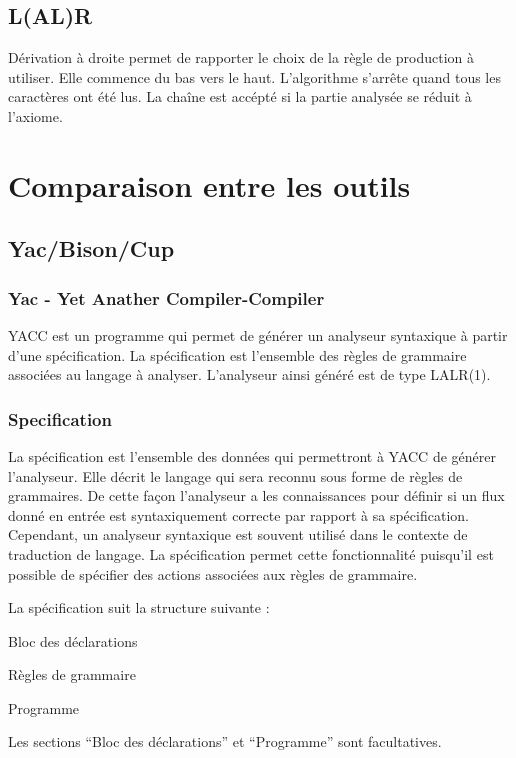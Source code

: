 \documentclass{article}
\begin{document}
\subsection{L(AL)R}
Dérivation à droite permet de rapporter le choix de la règle de production à utiliser.
Elle commence du bas vers le haut.
L’algorithme s’arrête quand tous les caractères ont été lus. La chaîne est accépté si la partie analysée se réduit à l’axiome.

\section{Comparaison entre les outils}
\label{hints}

\subsection{Yac/Bison/Cup}


\subsubsection{Yac - Yet Anather Compiler-Compiler}
YACC est un programme qui permet de générer un analyseur syntaxique à partir d’une spécification. La spécification est l’ensemble des règles de grammaire associées au langage à analyser.
L’analyseur ainsi généré est de type LALR(1).

\subsubsection{Specification}
La spécification est l’ensemble des données qui permettront à YACC de générer l’analyseur. Elle décrit le langage qui sera reconnu sous forme de règles de grammaires. De cette façon l’analyseur a les connaissances pour définir si un flux donné en entrée est syntaxiquement correcte par rapport à sa spécification.
Cependant, un analyseur syntaxique est souvent utilisé dans le contexte de traduction de langage. La spécification permet cette fonctionnalité puisqu’il est possible de spécifier des actions associées aux règles de grammaire.

La spécification suit la structure suivante :

Bloc des déclarations


Règles de grammaire


Programme

Les sections “Bloc des déclarations” et “Programme” sont facultatives.
\end{document}
